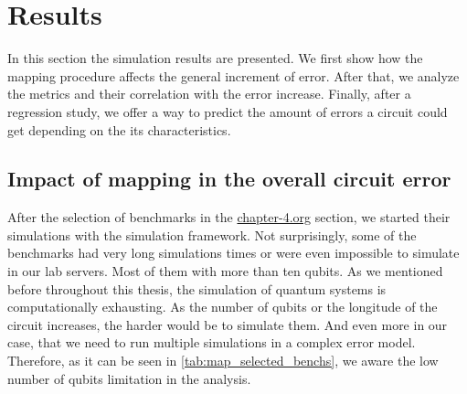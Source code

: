 
\chapter{Results}
\label{sec:org89605da}

In this section the simulation results are presented.
We first show how the mapping procedure affects the general increment of error.
After that, we analyze the metrics and their correlation with the error increase.
Finally, after a regression study, we offer a way to predict the amount of errors a circuit could get depending on the its characteristics.

\section{Impact of mapping in the overall circuit error}
\label{sec:org885658c}

After the selection of benchmarks in the \url{chapter-4.org} section, we started their simulations with the simulation framework.
Not surprisingly, some of the benchmarks had very long simulations times or were even impossible to simulate in our lab servers.
Most of them with more than ten qubits.
As we mentioned before throughout this thesis, the simulation of quantum systems is computationally exhausting.
As the number of qubits or the longitude of the circuit increases, the harder would be to simulate them.
And even more in our case, that we need to run multiple simulations in a complex error model.
Therefore, as it can be seen in \ref{tab:map_selected_benchs}, we aware the low number of qubits limitation in the analysis.

